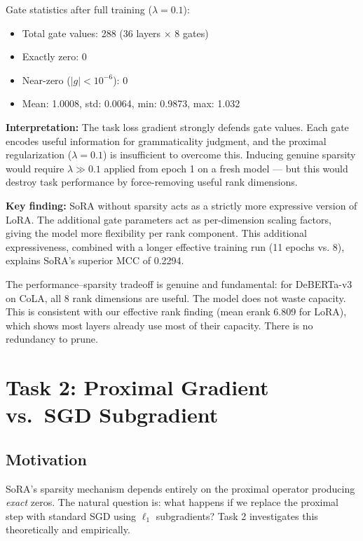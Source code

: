 \documentclass[12pt,a4paper]{article}
\theoremstyle{definition}
\begin{document}
Gate statistics after full training ($\lambda = 0.1$):
\begin{itemize}
    \item Total gate values: 288 (36 layers $\times$ 8 gates)
    \item Exactly zero: 0
    \item Near-zero ($|g| < 10^{-6}$): 0
    \item Mean: 1.0008, std: 0.0064, min: 0.9873, max: 1.032
\end{itemize}

\textbf{Interpretation:} The task loss gradient strongly defends gate values. Each gate encodes useful information for grammaticality judgment, and the proximal regularization ($\lambda = 0.1$) is insufficient to overcome this. Inducing genuine sparsity would require $\lambda \gg 0.1$ applied from epoch 1 on a fresh model — but this would destroy task performance by force-removing useful rank dimensions.

\textbf{Key finding:} SoRA without sparsity acts as a strictly more expressive version of LoRA. The additional gate parameters act as per-dimension scaling factors, giving the model more flexibility per rank component. This additional expressiveness, combined with a longer effective training run (11 epochs vs. 8), explains SoRA's superior MCC of 0.2294.

The performance--sparsity tradeoff is genuine and fundamental: for DeBERTa-v3 on CoLA, all 8 rank dimensions are useful. The model does not waste capacity. This is consistent with our effective rank finding (mean erank 6.809 for LoRA), which shows most layers already use most of their capacity. There is no redundancy to prune.

\section{Task 2: Proximal Gradient vs.\ SGD Subgradient}

\subsection{Motivation}

SoRA's sparsity mechanism depends entirely on the proximal operator producing \textit{exact} zeros. The natural question is: what happens if we replace the proximal step with standard SGD using $\ell_1$ subgradients? Task 2 investigates this theoretically and empirically.
\end{document}
